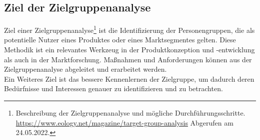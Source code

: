     \subsection{Ziel der Zielgruppenanalyse}
        Ziel einer Zielgruppenanalyse\footnote{Beschreibung der Zielgruppenanalyse und mögliche Durchführungsschritte. \url{https://www.eology.net/magazine/target-group-analysis} Abgerufen am 24.05.2022.} 
        ist die Identifizierung der Personengruppen, die als potentielle Nutzer eines Produktes 
        oder eines Marktsegmentes gelten. Diese Methodik ist ein relevantes Werkzeug in der Produktkonzeption und -entwicklung 
        als auch in der Marktforschung. Maßnahmen und Anforderungen können aus der Zielgruppenanalyse abgeleitet und 
        erarbeitet werden. 
        \\
        Ein Weiteres Ziel ist das bessere Kennenlernen der Zielgruppe, um dadurch deren Bedürfnisse und Interessen 
        genauer zu identifizieren und zu betrachten. 
    
